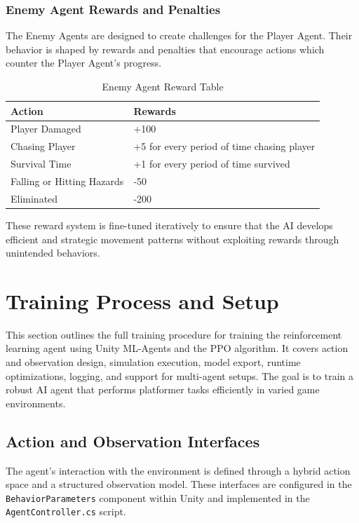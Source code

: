 \documentclass[12pt,oneside,openright,a4paper]{cpe-english-project}
\begin{document}
\subsubsection{Enemy Agent Rewards and Penalties}
The Enemy Agents are designed to create challenges for the Player Agent. Their behavior is shaped by rewards and penalties that encourage actions which counter the Player Agent's progress.\par
\begin{table}[!h]
\caption{Enemy Agent Reward Table}\label{tbl:Enemy Agent Reward Table}
\begin{tabular}{|l|l|} \hline
\textbf{Action} & \textbf{Rewards} \\ \hline
Player Damaged & +100  \\ 
Chasing Player & +5  for every period of time chasing player \\ 
Survival Time & +1 for every period of time survived \\
Falling or Hitting Hazards & -50 \\ 
Eliminated & -200 \\ \hline
\end{tabular}
\end{table}
These reward system is fine-tuned iteratively to ensure that the AI develops efficient and strategic movement patterns without exploiting rewards through unintended behaviors.\par


\section{Training Process and Setup}

This section outlines the full training procedure for training the reinforcement learning agent using Unity ML-Agents and the PPO algorithm. It covers action and observation design, simulation execution, model export, runtime optimizations, logging, and support for multi-agent setups. The goal is to train a robust AI agent that performs platformer tasks efficiently in varied game environments.

\subsection{Action and Observation Interfaces}

The agent's interaction with the environment is defined through a hybrid action space and a structured observation model. These interfaces are configured in the \texttt{BehaviorParameters} component within Unity and implemented in the \texttt{AgentController.cs} script.
\end{document}
